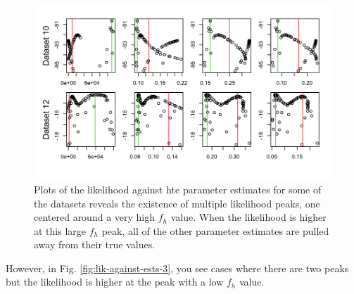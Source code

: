\documentclass[12pt,reqno,final,pdftex]{amsart}\usepackage[]{graphicx}\usepackage[]{color}
\newenvironment{knitrout}{}{} %
\theoremstyle{plain}
\numberwithin{equation}{part}
\begin{document}
\begin{knitrout}\scriptsize
{}\color{fgcolor}\begin{figure}

\includegraphics[width=\linewidth]{figure/lik-against-ests-2-1} \hfill{}

\caption[Plots of the likelihood against hte parameter estimates for some of the datasets reveals the existence of multiple likelihood peaks, one centered around a very high ]{Plots of the likelihood against hte parameter estimates for some of the datasets reveals the existence of multiple likelihood peaks, one centered around a very high $f_h$ value. When the likelihood is higher at this large $f_h$ peak, all of the other parameter estimates are pulled away from their true values.}\label{fig:lik-against-ests-2}
\end{figure}


\end{knitrout}

However, in Fig. \ref{fig:lik-against-ests-3}, you see cases where there are two peaks but the likelihood is higher at the peak with a low $f_h$ value.
\end{document}

